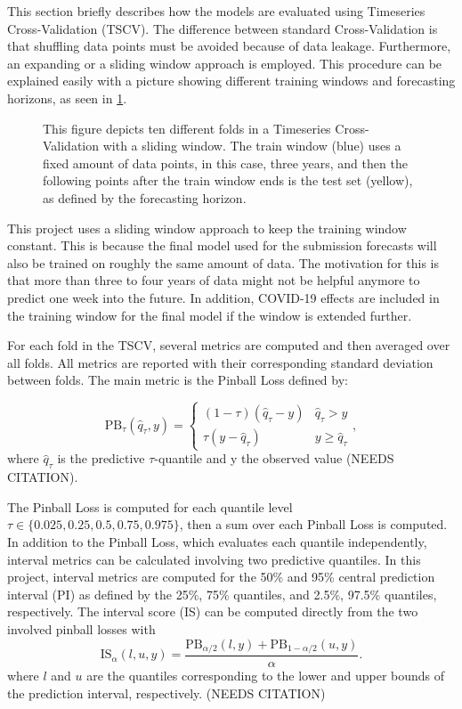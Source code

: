 This section briefly describes how the models are evaluated using Timeseries Cross-Validation (TSCV). The difference between standard Cross-Validation is that shuffling data points must be avoided because of data leakage. Furthermore, an expanding or a sliding window approach is employed. This procedure can be explained easily with a picture showing different training windows and forecasting horizons, as seen in \cref{fig:tscv}.
\begin{figure}[htbp]
    \centering
    
    \caption{This figure depicts ten different folds in a Timeseries Cross-Validation with a sliding window. The train window (blue) uses a fixed amount of data points, in this case, three years, and then the following points after the train window ends is the test set (yellow), as defined by the forecasting horizon.}
    \label{fig:tscv}
\end{figure}
This project uses a sliding window approach to keep the training window constant. This is because the final model used for the submission forecasts will also be trained on roughly the same amount of data. The motivation for this is that more than three to four years of data might not be helpful anymore to predict one week into the future. In addition, COVID-19 effects are included in the training window for the final model if the window is extended further. 

For each fold in the TSCV, several metrics are computed and then averaged over all folds. All metrics are reported with their corresponding standard deviation between folds. The main metric is the Pinball Loss defined by:

\begin{equation}
\label{eq:PinballLoss}
\text{PB}_{\tau}(\hat{q}_{\tau}, y) = 
\begin{cases} 
(1 - \tau) (\hat{q}_{\tau} - y) & \hat{q}_{\tau} > y \\
\tau (y - \hat{q}_{\tau}) & y \geq \hat{q}_{\tau}
\end{cases}
,
\end{equation}
where $\hat{q}_\tau$ is the predictive $\tau$-quantile and y the observed value (NEEDS CITATION).

The Pinball Loss is computed for each quantile level $\tau \in \{0.025, 0.25, 0.5, 0.75, 0.975\}$, then a sum over each Pinball Loss is computed. In addition to the Pinball Loss, which evaluates each quantile independently, interval metrics can be calculated involving two predictive quantiles. In this project, interval metrics are computed for the 50\% and 95\% central prediction interval (PI) as defined by the 25\%, 75\% quantiles, and 2.5\%, 97.5\% quantiles, respectively. The interval score (IS) can be computed directly from the two involved pinball losses with
\begin{equation}
\label{eq:IntervalScore}
\text{IS}_{\alpha}(l, u, y) = \frac{\text{PB}_{\alpha/2}(l, y) + \text{PB}_{1-\alpha/2}(u, y)}{\alpha}.
\end{equation}
where $l$ and $u$ are the quantiles corresponding to the lower and upper bounds of the prediction interval, respectively. (NEEDS CITATION)

